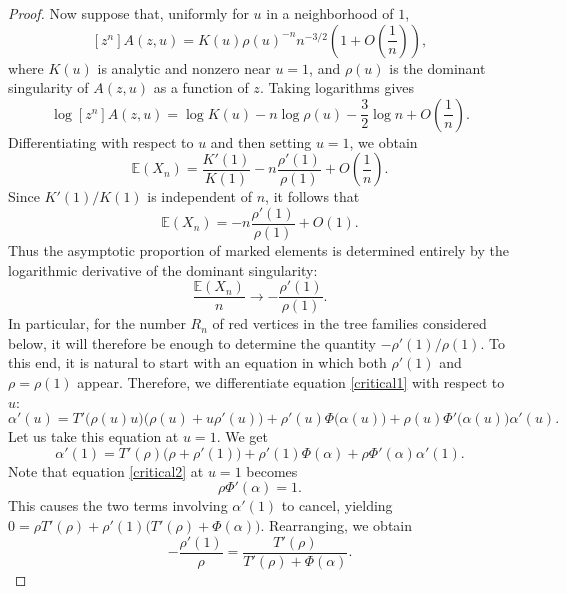 \documentclass[10pt,a4paper]{amsart}
\theoremstyle{remark}
\begin{document}
\begin{proof}
Now suppose that, uniformly for \(u\) in a neighborhood of \(1\),
\[
[z^n]A(z,u)
=
K(u)\rho(u)^{-n}n^{-3/2}
\left(1+O\left(\frac{1}{n}\right)\right),
\]
where \(K(u)\) is analytic and nonzero near \(u=1\), and \(\rho(u)\) is the dominant singularity of \(A(z,u)\) as a function of \(z\). Taking logarithms gives
\[
\log [z^n]A(z,u)
=
\log K(u)
-
n\log \rho(u)
-
\frac32\log n
+
O\left(\frac{1}{n}\right).
\]
Differentiating with respect to \(u\) and then setting \(u=1\), we obtain
\[
\mathbb E(X_n)
=
\frac{K'(1)}{K(1)}
-
n\frac{\rho'(1)}{\rho(1)}
+
O\left(\frac{1}{n}\right).
\]
Since \(K'(1)/K(1)\) is independent of \(n\), it follows that
\[
\mathbb E(X_n)
=
-n\frac{\rho'(1)}{\rho(1)}
+
O(1).
\]
Thus the asymptotic proportion of marked elements is determined entirely by the logarithmic derivative of the dominant singularity:
\[
{
\frac{\mathbb E(X_n)}{n}
\longrightarrow
-\frac{\rho'(1)}{\rho(1)}.
}
\]
In particular, for the number \(R_n\) of red vertices in the tree families considered below, it will therefore be enough to determine the quantity
$-\rho'(1)/\rho(1)$.
%
%
To this end, it is natural to start with an equation in which both
$\rho'(1)$ and $\rho=\rho(1)$ appear.
Therefore, we differentiate equation \eqref{critical1} with respect to \(u\):
\[
\alpha'(u)
=
T'\big(\rho(u)u\big)
\bigl(\rho(u)+u\rho'(u)\bigr)
+
\rho'(u)\Phi\big(\alpha(u)\big)
+
\rho(u)\Phi'\big(\alpha(u)\big)\alpha'(u).
\]
Let us take this equation at $u=1$.
We get \[\alpha'(1)=T'(\rho)\big(\rho+\rho'(1)\big) + \rho'(1)\Phi(\alpha)
+
\rho\Phi'(\alpha)\alpha'(1).
\]
Note  that
 equation \eqref{critical2} at $u=1$ becomes
\begin{equation}\label{eq:char}
\rho\Phi'(\alpha)=1.
\end{equation}
This 
causes the two terms involving \(\alpha'(1)\) to cancel, yielding
$
0
=
\rho T'(\rho)
+
\rho'(1)
\bigl(T'(\rho)+\Phi(\alpha)\bigr).
$
Rearranging, we obtain
\begin{equation} \label{theratio}
-\frac{\rho'(1)}{\rho}
=
\frac{T'(\rho)}
{T'(\rho)+\Phi(\alpha)}.
\end{equation}


\end{proof}
\end{document}
